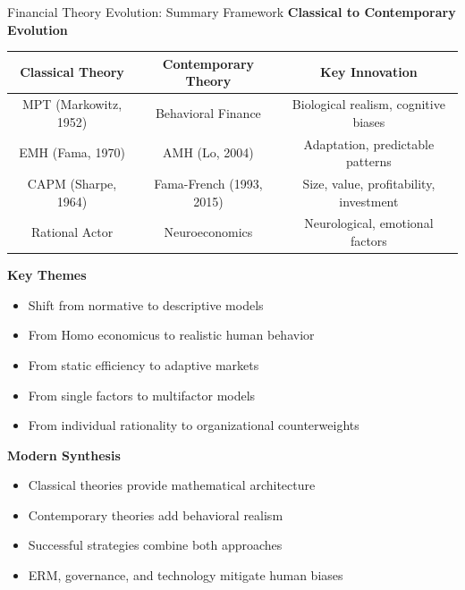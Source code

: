 \documentclass[aspectratio=169,10pt]{beamer}
\renewcommand{\small}{\fontsize{7pt}{8.5pt}\selectfont}
\renewcommand{\large}{\fontsize{9pt}{11pt}\selectfont}
\newcommand{\question}[1]{{\large\bfseries\color{crimson}#1}}
\begin{document}
	\begin{frame}{Financial Theory Evolution: Summary Framework}
		\question{Classical to Contemporary Evolution}
		\small
		
		\begin{table}[h]
			\centering
			\begin{tabular}{|c|c|c|}
				\hline
				\textbf{Classical Theory} & \textbf{Contemporary Theory} & \textbf{Key Innovation} \\
				\hline
				MPT (Markowitz, 1952) & Behavioral Finance & Biological realism, cognitive biases \\
				EMH (Fama, 1970) & AMH (Lo, 2004) & Adaptation, predictable patterns \\
				CAPM (Sharpe, 1964) & Fama-French (1993, 2015) & Size, value, profitability, investment \\
				Rational Actor & Neuroeconomics & Neurological, emotional factors \\
				\hline
			\end{tabular}
		\end{table}
		
		\vspace{0.1cm}
		\question{Key Themes}
		\small
		\begin{itemize}
			\item Shift from normative to descriptive models
			\item From Homo economicus to realistic human behavior
			\item From static efficiency to adaptive markets
			\item From single factors to multifactor models
			\item From individual rationality to organizational counterweights
		\end{itemize}
		
		\vspace{0.1cm}
		\question{Modern Synthesis}
		\small
		\begin{itemize}
			\item Classical theories provide mathematical architecture
			\item Contemporary theories add behavioral realism
			\item Successful strategies combine both approaches
			\item ERM, governance, and technology mitigate human biases
		\end{itemize}
	\end{frame}
	
	
\end{document}
